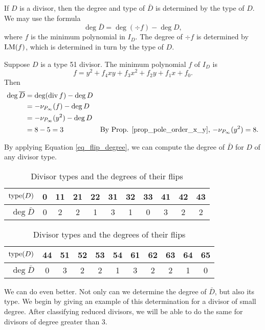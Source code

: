 If $D$ is a divisor, then the degree and type of $\bar D$ is determined by the type of $D$.
We may use the formula
\begin{equation}
  \label{eq_flip_degree}
  \deg \bar D = \deg (\div f) - \deg D,
\end{equation}
where $f$ is the minimum polynomial in $I_D$. The degree of $\div f$ is determined by $\LM(f)$,
which is determined in turn by the type of $D$.
\begin{example}
  Suppose $D$ is a type 51 divisor.
  The minimum polynomial $f$ of $I_D$ is
  \[ f = y^2 + f_4xy + f_3x^2 + f_2y + f_1x + f_0. \]
  Then
  \begin{align*}
    \deg \bar D &= \deg (\div f) - \deg D \\
                &= -\nu_{P_\infty}(f) - \deg D \\
                &= -\nu_{P_\infty}(y^2) - \deg D \\
                &= 8 - 5 = 3
                  & \text{By Prop. \ref{prop_pole_order_x_y}, $-\nu_{P_\infty}(y^2) = 8$.}
  \end{align*}
\end{example}

By applying Equation \ref{eq_flip_degree},
we can compute the degree of $\bar D$ for $D$ of any divisor type.
\begin{table}[hb!]
\caption{Divisor types and the degrees of their flips}
\label{tab_flip_degree}
\begin{center}
  \begin{tabular}{r|cccccccccc}
    $\type(D)$    & 0 & 11 & 21 & 22 & 31 & 32 & 33 & 41 & 42 & 43 \\
    \hline
    $\deg \bar D$ & 0 & 2  & 2  & 1  & 3  & 1  & 0  & 3  & 2  & 2
  \end{tabular}
    
  \begin{tabular}{r|cccccccccc}
    $\type(D)$    & 44 & 51 & 52 & 53 & 54 & 61 & 62 & 63 & 64 & 65 \\
    \hline 
    $\deg \bar D$ & 0  & 3  & 2  & 2  & 1  & 3  & 2  & 2  & 1  & 0
  \end{tabular}
\end{center}
\end{table}

We can do even better.
Not only can we determine the degree of $\bar D$, but also its type.
We begin by giving an example of this determination for a divisor of small degree.
After classifying reduced divisors, we will be able to do the same for divisors of degree greater than 3.

